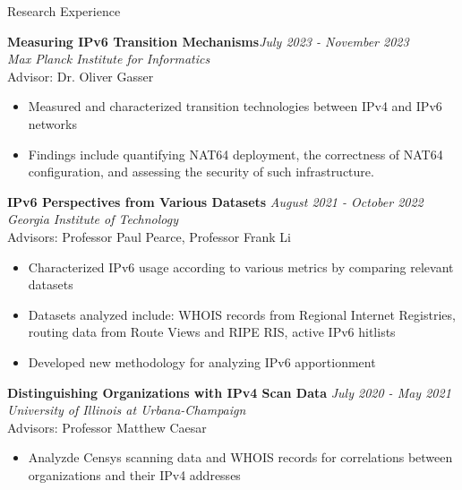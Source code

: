 \documentclass{resume} %
\begin{document}
	\begin{rSection}{Research Experience}
		
		
		{\bf Measuring IPv6 Transition Mechanisms}\hfill{\em July 2023 - November 2023}\\
		{\em Max Planck Institute for Informatics}\\
		{Advisor: Dr. Oliver Gasser}
		\begin{itemize}
			\item Measured and characterized transition technologies between IPv4 and IPv6 networks
			\item Findings include quantifying NAT64 deployment, the correctness of NAT64 configuration, and assessing the security of such infrastructure.
		\end{itemize}
		
		{\bf IPv6 Perspectives from Various Datasets} \hfill{\em August 2021 - October 2022}\\
		{\em Georgia Institute of Technology}\\
		{Advisors: Professor Paul Pearce, Professor Frank Li}
		\begin{itemize}
			\item Characterized IPv6 usage according to various metrics by comparing relevant datasets
			\item Datasets analyzed include: WHOIS records from Regional Internet Registries, routing data from Route Views and RIPE RIS, active IPv6 hitlists
			\item Developed new methodology for analyzing IPv6 apportionment
		\end{itemize}
		
		{\bf Distinguishing Organizations with IPv4 Scan Data} \hfill{\em July 2020 - May 2021}\\
		{\em University of Illinois at Urbana-Champaign}\\
		{Advisors: Professor Matthew Caesar}
		\begin{itemize}
			\item Analyzde Censys scanning data and WHOIS records for correlations between organizations and their IPv4 addresses
		\end{itemize}
		

\end{rSection}
\end{document}
